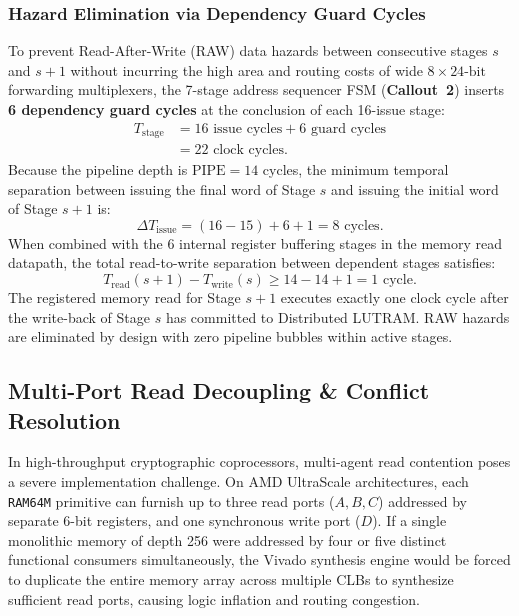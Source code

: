 \subsubsection{Hazard Elimination via Dependency Guard Cycles}
To prevent Read-After-Write (RAW) data hazards between consecutive stages $s$ and $s+1$ without incurring the high area and routing costs of wide $8 \times 24\text{-bit}$ forwarding multiplexers, the 7-stage address sequencer FSM (\textbf{Callout~2}) inserts \textbf{6 dependency guard cycles} at the conclusion of each 16-issue stage:
\begin{align}
\label{eq:stage_cycles}
T_{\text{stage}} &= 16 \text{ issue cycles} + 6 \text{ guard cycles} \nonumber \\
&= 22 \text{ clock cycles}.
\end{align}
Because the pipeline depth is $\text{PIPE} = 14$ cycles, the minimum temporal separation between issuing the final word of Stage $s$ and issuing the initial word of Stage $s+1$ is:
\begin{equation}
\label{eq:issue_separation}
\Delta T_{\text{issue}} = (16 - 15) + 6 + 1 = 8 \text{ cycles}.
\end{equation}
When combined with the 6 internal register buffering stages in the memory read datapath, the total read-to-write separation between dependent stages satisfies:
\begin{equation}
\label{eq:hazard_separation}
T_{\text{read}}(s+1) - T_{\text{write}}(s) \ge 14 - 14 + 1 = 1 \text{ cycle}.
\end{equation}
The registered memory read for Stage $s+1$ executes exactly one clock cycle after the write-back of Stage $s$ has committed to Distributed LUTRAM. RAW hazards are eliminated by design with zero pipeline bubbles within active stages.

\subsection{Multi-Port Read Decoupling \& Conflict Resolution}
\label{sec:mem_multiport}

In high-throughput cryptographic coprocessors, multi-agent read contention poses a severe implementation challenge. On AMD UltraScale architectures, each \texttt{RAM64M} primitive can furnish up to three read ports ($A, B, C$) addressed by separate 6-bit registers, and one synchronous write port ($D$). If a single monolithic memory of depth 256 were addressed by four or five distinct functional consumers simultaneously, the Vivado synthesis engine would be forced to duplicate the entire memory array across multiple CLBs to synthesize sufficient read ports, causing logic inflation and routing congestion.

